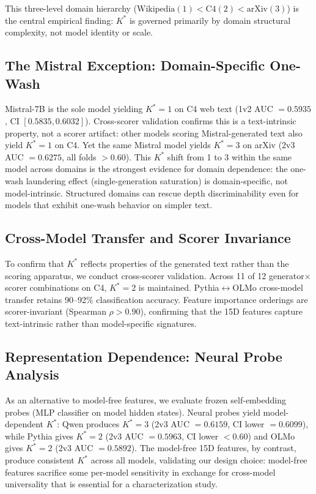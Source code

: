 \documentclass[11pt,a4paper]{article}
\begin{document}
This three-level domain hierarchy ($\text{Wikipedia}(1) < \text{C4}(2) < \text{arXiv}(3)$) is the central empirical finding: $K^*$ is governed primarily by domain structural complexity, not model identity or scale.

\subsection{The Mistral Exception: Domain-Specific One-Wash}
\label{sec:mistral}

Mistral-7B is the sole model yielding $K^*\!=\!1$ on C4 web text (1v2 AUC $= 0.5935$, CI $[0.5835, 0.6032]$). Cross-scorer validation confirms this is a text-intrinsic property, not a scorer artifact: other models scoring Mistral-generated text also yield $K^*\!=\!1$ on C4. Yet the same Mistral model yields $K^*\!=\!3$ on arXiv (2v3 AUC $= 0.6275$, all folds $> 0.60$). This $K^*$ shift from 1 to 3 within the same model across domains is the strongest evidence for domain dependence: the one-wash laundering effect (single-generation saturation) is domain-specific, not model-intrinsic. Structured domains can rescue depth discriminability even for models that exhibit one-wash behavior on simpler text.

\subsection{Cross-Model Transfer and Scorer Invariance}

To confirm that $K^*$ reflects properties of the generated text rather than the scoring apparatus, we conduct cross-scorer validation. Across 11 of 12 generator$\times$scorer combinations on C4, $K^*\!=\!2$ is maintained. Pythia$\leftrightarrow$OLMo cross-model transfer retains 90--92\% classification accuracy. Feature importance orderings are scorer-invariant (Spearman $\rho > 0.90$), confirming that the 15D features capture text-intrinsic rather than model-specific signatures.

\subsection{Representation Dependence: Neural Probe Analysis}
\label{sec:neural}

As an alternative to model-free features, we evaluate frozen self-embedding probes (MLP classifier on model hidden states). Neural probes yield model-dependent $K^*$: Qwen produces $K^*\!=\!3$ (2v3 AUC $= 0.6159$, CI lower $= 0.6099$), while Pythia gives $K^*\!=\!2$ (2v3 AUC $= 0.5963$, CI lower $< 0.60$) and OLMo gives $K^*\!=\!2$ (2v3 AUC $= 0.5892$). The model-free 15D features, by contrast, produce consistent $K^*$ across all models, validating our design choice: model-free features sacrifice some per-model sensitivity in exchange for cross-model universality that is essential for a characterization study.
\end{document}
